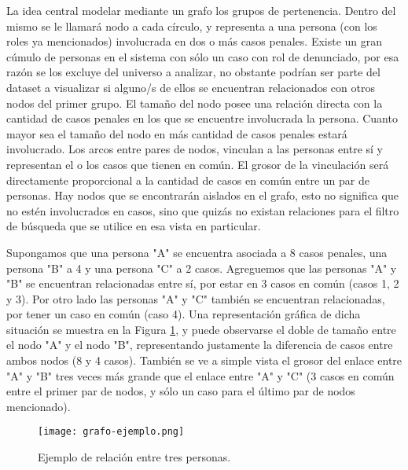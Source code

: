 La idea central modelar mediante un grafo los grupos de pertenencia. Dentro del mismo se le llamará nodo a cada círculo, y representa a una persona (con los roles ya mencionados) involucrada en dos o más casos penales. Existe un gran cúmulo de personas en el sistema con sólo un caso con rol de denunciado, por esa razón se los excluye del universo a analizar, no obstante podrían ser parte del dataset a visualizar si alguno/s de ellos se encuentran relacionados con otros nodos del primer grupo. El tamaño del nodo posee una relación directa con la cantidad de casos penales en los que se encuentre involucrada la persona. Cuanto mayor sea el tamaño del nodo en más cantidad de casos penales estará involucrado.
Los arcos entre pares de nodos, vinculan a las personas entre sí y representan el o los casos que tienen en común. El grosor de la vinculación será directamente proporcional a la cantidad de casos en común entre un par de personas. Hay nodos que se encontrarán aislados en el grafo, esto no significa que no estén involucrados en casos, sino que quizás no existan relaciones para el filtro de búsqueda que se utilice en esa vista en particular.

Supongamos que una persona "A" se encuentra asociada a 8 casos penales, una persona "B" a 4 y una persona "C" a 2 casos. Agreguemos que las personas "A" y "B" se encuentran relacionadas entre sí, por estar en 3 casos en común (casos 1, 2 y 3). Por otro lado las personas "A" y "C" también se encuentran relacionadas, por tener un caso en común (caso 4).  Una representación gráfica de dicha situación se muestra en la Figura \ref{fig:grafode2}, y puede observarse el doble de tamaño entre el nodo "A" y el nodo "B", representando justamente la diferencia de casos entre ambos nodos (8 y 4 casos). También se ve a simple vista el grosor del enlace entre "A" y "B" tres veces más grande que el enlace entre "A" y "C" (3 casos en común entre el primer par de nodos, y sólo un caso para el último par de nodos mencionado). 
\vspace{-15pt}
\begin{figure}
	\centering
	\texttt{[image: grafo-ejemplo.png]}
	\caption{Ejemplo de relación entre tres personas.} 
	\label{fig:grafode2}
\end{figure}
\vspace{-25pt}